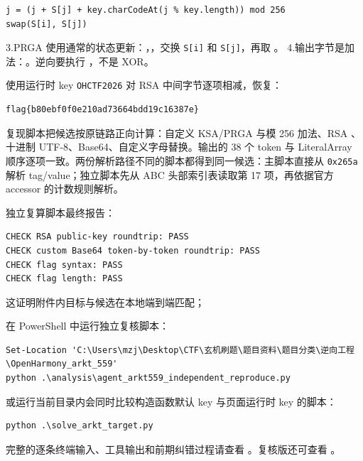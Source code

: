 \begin{verbatim}
j = (j + S[j] + key.charCodeAt(j % key.length)) mod 256
swap(S[i], S[j])
\end{verbatim}

3.PRGA 使用通常的状态更新：\texttt{}，\texttt{}，交换 \texttt{S{[}i{]}} 和 \texttt{S{[}j{]}}，再取 \texttt{}。 4.输出字节是加法：\texttt{}。逆向要执行 \texttt{}，不是 XOR。

使用运行时 key \texttt{OHCTF2026} 对 RSA 中间字节逐项相减，恢复：

\begin{verbatim}
flag{b80ebf0f0e210ad73664bdd19c16387e}
\end{verbatim}

复现脚本把候选按原链路正向计算：自定义 KSA/PRGA 与模 256 加法、RSA \texttt{}、十进制 UTF-8、Base64、自定义字母替换。输出的 38 个 token 与 LiteralArray 顺序逐项一致。两份解析路径不同的脚本都得到同一候选：主脚本直接从 \texttt{0x265a} 解析 tag/value；独立脚本先从 ABC 头部索引表读取第 17 项，再依据官方 accessor 的计数规则解析。

独立复算脚本最终报告：

\begin{verbatim}
CHECK RSA public-key roundtrip: PASS
CHECK custom Base64 token-by-token roundtrip: PASS
CHECK flag syntax: PASS
CHECK flag length: PASS
\end{verbatim}

这证明附件内目标与候选在本地端到端匹配；

在 PowerShell 中运行独立复核脚本：

\begin{verbatim}
Set-Location 'C:\Users\mzj\Desktop\CTF\玄机刷题\题目资料\题目分类\逆向工程\OpenHarmony_arkt_559'
python .\analysis\agent_arkt559_independent_reproduce.py
\end{verbatim}

或运行当前目录内会同时比较构造函数默认 key 与页面运行时 key 的脚本：

\begin{verbatim}
python .\solve_arkt_target.py
\end{verbatim}

完整的逐条终端输入、工具输出和前期纠错过程请查看 \texttt{}。复核版还可查看 \texttt{}。

